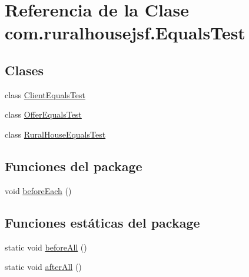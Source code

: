 \hypertarget{classcom_1_1ruralhousejsf_1_1_equals_test}{}\section{Referencia de la Clase com.\+ruralhousejsf.\+Equals\+Test}
\label{classcom_1_1ruralhousejsf_1_1_equals_test}
\subsection*{Clases}
\begin{DoxyCompactItemize}
\item 
class \mbox{\hyperlink{classcom_1_1ruralhousejsf_1_1_equals_test_1_1_client_equals_test}{Client\+Equals\+Test}}
\item 
class \mbox{\hyperlink{classcom_1_1ruralhousejsf_1_1_equals_test_1_1_offer_equals_test}{Offer\+Equals\+Test}}
\item 
class \mbox{\hyperlink{classcom_1_1ruralhousejsf_1_1_equals_test_1_1_rural_house_equals_test}{Rural\+House\+Equals\+Test}}
\end{DoxyCompactItemize}
\subsection*{Funciones del \textquotesingle{}package\textquotesingle{}}
\begin{DoxyCompactItemize}
\item 
void \mbox{\hyperlink{classcom_1_1ruralhousejsf_1_1_equals_test_ac6b6f6de31519a6882e0ec812b03442c}{before\+Each}} ()
\end{DoxyCompactItemize}
\subsection*{Funciones estáticas del \textquotesingle{}package\textquotesingle{}}
\begin{DoxyCompactItemize}
\item 
static void \mbox{\hyperlink{classcom_1_1ruralhousejsf_1_1_equals_test_a114c96cfa4dbde48a42802952f8cd5b0}{before\+All}} ()
\item 
static void \mbox{\hyperlink{classcom_1_1ruralhousejsf_1_1_equals_test_afea5be25670fd0d03ebb37e737bda19b}{after\+All}} ()
\end{DoxyCompactItemize}
